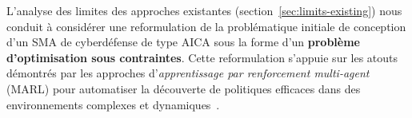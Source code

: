 \documentclass[ twoside,openright,titlepage,numbers=noenddot,headinclude,%
                footinclude=true,cleardoublepage=empty,abstractoff, %
                BCOR=5mm,paper=a4,fontsize=11pt,%
                french,american,%
                ]{scrreprt}
\begin{document}

L'analyse des limites des approches existantes (section~\ref{sec:limits-existing}) nous conduit à considérer une reformulation de la problématique initiale de conception d'un SMA de cyberdéfense de type AICA sous la forme d'un \textbf{problème d'optimisation sous contraintes}. Cette reformulation s'appuie sur les atouts démontrés par les approches d'\textit{apprentissage par renforcement multi-agent} (MARL) pour automatiser la découverte de politiques efficaces dans des environnements complexes et dynamiques~\cite{Zhang2021survey, Papoudakis2021}.
\end{document}
